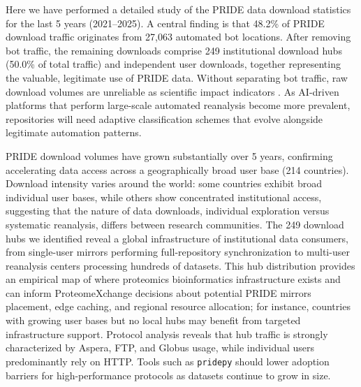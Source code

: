 \documentclass[11pt,a4paper]{article}
\begin{document}
\begin{sloppypar}
Here we have performed a detailed study of the PRIDE data download statistics for the last 5 years (2021--2025). A central finding is that 48.2\% of PRIDE download traffic originates from 27,063 automated bot locations. After removing bot traffic, the remaining downloads comprise 249 institutional download hubs (50.0\% of total traffic) and independent user downloads, together representing the valuable, legitimate use of PRIDE data. Without separating bot traffic, raw download volumes are unreliable as scientific impact indicators \citep{PerezRiverol2019}. As AI-driven platforms that perform large-scale automated reanalysis become more prevalent, repositories will need adaptive classification schemes that evolve alongside legitimate automation patterns.

PRIDE download volumes have grown substantially over 5 years, confirming accelerating data access across a geographically broad user base (214 countries). Download intensity varies around the world: some countries exhibit broad individual user bases, while others show concentrated institutional access, suggesting that the nature of data downloads, individual exploration versus systematic reanalysis, differs between research communities. The 249 download hubs we identified reveal a global infrastructure of institutional data consumers, from single-user mirrors performing full-repository synchronization to multi-user reanalysis centers processing hundreds of datasets. This hub distribution provides an empirical map of where proteomics bioinformatics infrastructure exists and can inform ProteomeXchange decisions about potential PRIDE mirrors placement, edge caching, and regional resource allocation; for instance, countries with growing user bases but no local hubs may benefit from targeted infrastructure support. Protocol analysis reveals that hub traffic is strongly characterized by Aspera, FTP, and Globus usage, while individual users predominantly rely on HTTP. Tools such as \texttt{pridepy} \citep{Kamatchinathan2025} should lower adoption barriers for high-performance protocols as datasets continue to grow in size.


\end{sloppypar}
\end{document}
